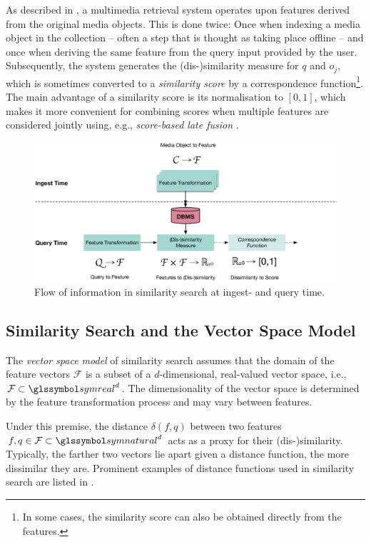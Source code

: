 As described in , a multimedia retrieval system operates upon features derived from the original media objects. This is done twice: Once when indexing a media object in the collection -- often a step that is thought as taking place offline -- and once when deriving the same feature from the query input provided by the user. Subsequently, the system generates the (dis-)similarity measure for $q$ and $o_j$, which is sometimes converted to a \emph{similarity score} by a correspondence function\footnote{In some cases, the similarity score can also be obtained directly from the features.}. The main advantage of a similarity score is its normalisation to $\left[ 0, 1 \right]$, which makes it more convenient for combining scores when multiple features are considered jointly using, e.g., \emph{score-based late fusion} \cite{Depeursinge:2010Fusion,Rossetto:2018thesis}. 

\begin{figure}[ht]
    \centering
    \includegraphics[width=\textwidth]{figures/multimedia-retrieval-pipeline}
    \caption{Flow of information in similarity search at ingest- and query time.}
    \label{figure:multimedia_retrieval_flow}
\end{figure}

\subsection{Similarity Search and the Vector Space Model}

The \emph{vector space model} of similarity search assumes that the domain of the feature vectors $\mathcal{F}$ is a subset of a $d$-dimensional, real-valued vector space, i.e., $\mathcal{F} \subset \symreal^d$. The dimensionality of the vector space is determined by the feature transformation process and may vary between features.

Under this premise, the distance $\delta(f,q)$ between two features $f,q \in \mathcal{F} \subset \symnatural^d$ acts as a proxy for their (dis-)similarity. Typically, the farther two vectors lie apart given a distance function, the more dissimilar they are. Prominent examples of distance functions used in similarity search are listed in . 

